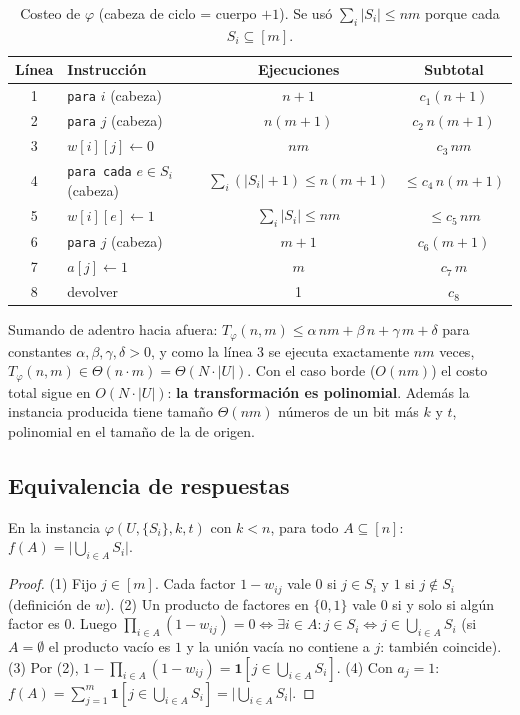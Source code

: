 \begin{table}[h]
\centering
\begin{tabular}{@{}clcc@{}}
\toprule
Línea & Instrucción & Ejecuciones & Subtotal\\
\midrule
1 & \texttt{para} $i$ (cabeza) & $n+1$ & $c_1(n+1)$\\
2 & \texttt{para} $j$ (cabeza) & $n(m+1)$ & $c_2\,n(m+1)$\\
3 & $w[i][j]\gets0$ & $nm$ & $c_3\,nm$\\
4 & \texttt{para cada} $e\in S_i$ (cabeza) & $\sum_i(|S_i|+1)\le n(m+1)$ & $\le c_4\,n(m+1)$\\
5 & $w[i][e]\gets 1$ & $\sum_i|S_i|\le nm$ & $\le c_5\,nm$\\
6 & \texttt{para} $j$ (cabeza) & $m+1$ & $c_6(m+1)$\\
7 & $a[j]\gets 1$ & $m$ & $c_7\,m$\\
8 & devolver & 1 & $c_8$\\
\bottomrule
\end{tabular}
\caption{Costeo de $\varphi$ (cabeza de ciclo = cuerpo $+1$). Se usó $\sum_i|S_i|\le nm$ porque cada $S_i\subseteq[m]$.}\label{tab:costophi}
\end{table}
Sumando de adentro hacia afuera: $T_\varphi(n,m)\le \alpha\,nm+\beta\,n+\gamma\,m+\delta$ para constantes $\alpha,\beta,\gamma,\delta>0$, y como la línea 3 se ejecuta exactamente $nm$ veces, $T_\varphi(n,m)\in\Theta(n\cdot m)=\Theta(N\cdot|U|)$. Con el caso borde ($O(nm)$) el costo total sigue en $O(N\cdot|U|)$: \textbf{la transformación es polinomial}. Además la instancia producida tiene tamaño $\Theta(nm)$ números de un bit más $k$ y $t$, polinomial en el tamaño de la de origen.

\subsection{Equivalencia de respuestas}

\begin{lema}\label{lem:cobertura}
En la instancia $\varphi(U,\{S_i\},k,t)$ con $k<n$, para todo $A\subseteq[n]$: $f(A)=\bigl|\bigcup_{i\in A}S_i\bigr|$.
\end{lema}
\begin{proof}
(1) Fijo $j\in[m]$. Cada factor $1-w_{ij}$ vale $0$ si $j\in S_i$ y $1$ si $j\notin S_i$ (definición de $w$).
(2) Un producto de factores en $\{0,1\}$ vale $0$ si y solo si algún factor es $0$. Luego $\prod_{i\in A}(1-w_{ij})=0 \iff \exists i\in A: j\in S_i \iff j\in\bigcup_{i\in A}S_i$ (si $A=\emptyset$ el producto vacío es $1$ y la unión vacía no contiene a $j$: también coincide).
(3) Por (2), $1-\prod_{i\in A}(1-w_{ij})=\mathbf{1}[j\in\bigcup_{i\in A}S_i]$.
(4) Con $a_j=1$: $f(A)=\sum_{j=1}^{m}\mathbf{1}[j\in\bigcup_{i\in A}S_i]=\bigl|\bigcup_{i\in A}S_i\bigr|$.
\end{proof}

